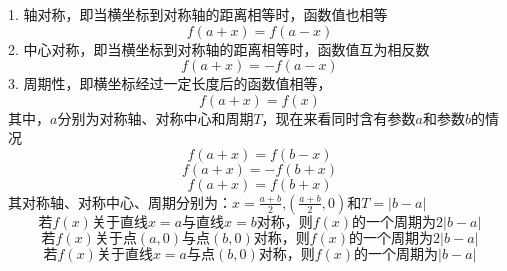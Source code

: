 1. 轴对称，即当横坐标到对称轴的距离相等时，函数值也相等
\begin{equation}
f\left( {a + x} \right) = f\left( {a - x} \right)
\end{equation}
2. 中心对称，即当横坐标到对称轴的距离相等时，函数值互为相反数
\begin{equation}
f\left( {a + x} \right) =  - f\left( {a - x} \right)
\end{equation}
3. 周期性，即横坐标经过一定长度后的函数值相等，
\begin{equation}
f\left( {a + x} \right) = f\left( x \right)
\end{equation}
其中，$a$分别为对称轴、对称中心和周期$T$，现在来看同时含有参数$a$和参数$b$的情况
\begin{equation}
f\left( {a + x} \right) = f\left( {b - x} \right)
\end{equation}
\begin{equation}
f\left( {a + x} \right) =  - f\left( {b + x} \right)
\end{equation}
\begin{equation}
f\left( {a + x} \right) = f\left( {b + x} \right)
\end{equation}
其对称轴、对称中心、周期分别为：$x = \frac{{a + b}}{2}$,$\left( {\frac{{a + b}}{2},0} \right)$和$T = \left| {b - a} \right|$
\begin{equation}
若f(x)关于直线x=a与直线x=b对称，则f(x)的一个周期为2\left| {b - a} \right|
\end{equation}
\begin{equation}
若f(x)关于点(a,0)与点(b,0)对称，则f(x)的一个周期为2\left| {b - a} \right|
\end{equation}
\begin{equation}
若f(x)关于直线x=a与点(b,0)对称，则f(x)的一个周期为\left| {b - a} \right|
\end{equation}